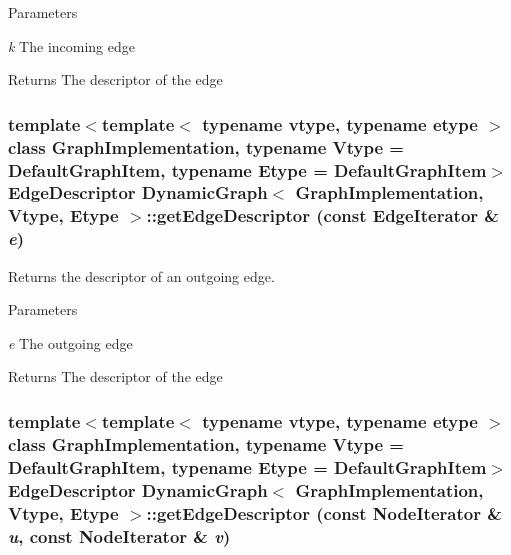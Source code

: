 \begin{DoxyParams}{Parameters}
\item[{\em k}]The incoming edge \end{DoxyParams}
\begin{DoxyReturn}{Returns}
The descriptor of the edge 
\end{DoxyReturn}
\hypertarget{class_dynamic_graph_afb6635b9e02a5b74797a8e9349b4e022}{
\subsubsection[{getEdgeDescriptor}]{\setlength{\rightskip}{0pt plus 5cm}template$<$template$<$ typename vtype, typename etype $>$ class GraphImplementation, typename Vtype  = DefaultGraphItem, typename Etype  = DefaultGraphItem$>$ EdgeDescriptor {\bf DynamicGraph}$<$ GraphImplementation, Vtype, Etype $>$::getEdgeDescriptor (const EdgeIterator \& {\em e})}}
\label{class_dynamic_graph_afb6635b9e02a5b74797a8e9349b4e022}


Returns the descriptor of an outgoing edge. 


\begin{DoxyParams}{Parameters}
\item[{\em e}]The outgoing edge \end{DoxyParams}
\begin{DoxyReturn}{Returns}
The descriptor of the edge 
\end{DoxyReturn}
\hypertarget{class_dynamic_graph_a83a9c51df95e5e3ef353b64f58781f00}{
\subsubsection[{getEdgeDescriptor}]{\setlength{\rightskip}{0pt plus 5cm}template$<$template$<$ typename vtype, typename etype $>$ class GraphImplementation, typename Vtype  = DefaultGraphItem, typename Etype  = DefaultGraphItem$>$ EdgeDescriptor {\bf DynamicGraph}$<$ GraphImplementation, Vtype, Etype $>$::getEdgeDescriptor (const NodeIterator \& {\em u}, \/  const NodeIterator \& {\em v})}}
\label{class_dynamic_graph_a83a9c51df95e5e3ef353b64f58781f00}


